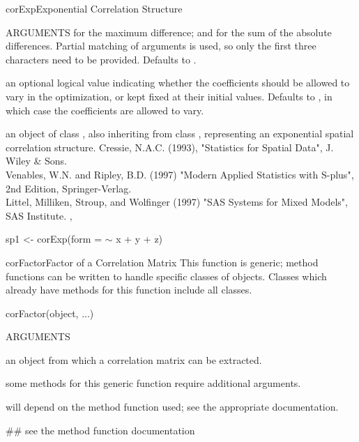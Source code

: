 \documentclass[pdftex]{article} \usepackage{url,graphicx}
\renewcommand{\Twiddle}{\mbox{\(\sim\)}}
\begin{document}
\begin{Helpfile}{corExp}{Exponential Correlation Structure}
\begin{Argument}{ARGUMENTS}
   for the maximum difference; and  for
  the sum of the absolute differences. Partial matching of arguments
  is used, so only the first three characters need to be provided.
  Defaults to .
\item[\Co{fixed:}] an optional logical value indicating whether the
  coefficients should be allowed to vary in the optimization, or kept
  fixed at their initial values. Defaults to , in which case
  the coefficients are allowed to vary.
\end{Argument}
an object of class , also inheriting from class
, representing an exponential spatial correlation
structure.
  Cressie, N.A.C. (1993), "Statistics for Spatial Data", J. Wiley \& Sons.\\
Venables, W.N. and Ripley, B.D. (1997) "Modern Applied Statistics with
S-plus", 2nd Edition, Springer-Verlag.\\
Littel, Milliken, Stroup, and Wolfinger (1997) "SAS Systems for Mixed
Models", SAS Institute.
, 
\need 15pt
\vspace{-16pt}
\begin{Example}
sp1 <- corExp(form = {\Twiddle} x + y + z)
\end{Example}
\end{Helpfile}
\begin{Helpfile}{corFactor}{Factor of a Correlation Matrix}
This function is generic; method functions can be written to handle
specific classes of objects. Classes which already have methods for
this function include all  classes.
\begin{Example}
corFactor(object, ...)
\end{Example}
\begin{Argument}{ARGUMENTS}
\item[\Co{object:}]
an object from which a correlation matrix can be
extracted.
\item[\Co{...:}]
some methods for this generic function require additional
arguments.
\end{Argument}
will depend on the method function used; see the appropriate
documentation.
\need 15pt
\vspace{-16pt} 
\begin{Example}
## see the method function documentation
\end{Example}
\end{Helpfile}
\end{document}
